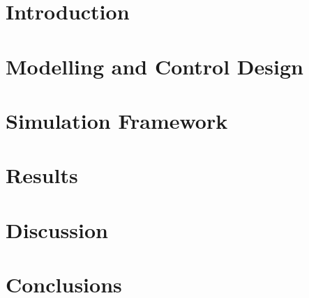 \documentclass[a4paper, 12pt]{report}
\begin{document}

\chapter{Introduction}



\chapter{Modelling and Control Design}


\chapter{Simulation Framework}



\chapter{Results}



\chapter{Discussion}



\chapter{Conclusions}


\newpage
{}
\printbibliography %


\fancyhf{} %
\renewcommand{\headrulewidth}{0pt} %
\fancyfoot[C]{\thepage} %

%
\end{document}
